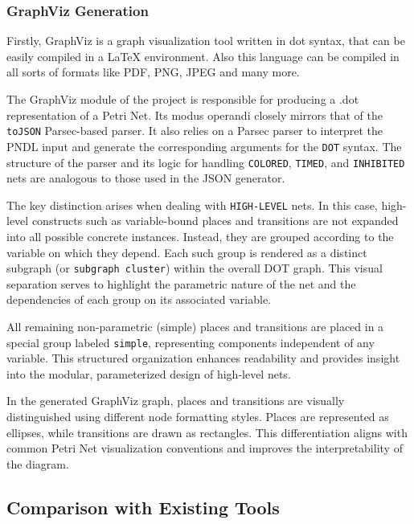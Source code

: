 \documentclass[12pt]{article}
\begin{document}
        
        \subsubsection{GraphViz Generation}
            Firstly, GraphViz is a graph visualization tool written in dot syntax, that can be easily compiled in a LaTeX environment. Also this language can be compiled in all sorts of formats like PDF, PNG, JPEG and many more.  

            The GraphViz module of the project is responsible for producing a .dot representation of a Petri Net. Its modus operandi closely mirrors that of the \texttt{toJSON} Parsec-based parser. It also relies on a Parsec parser to interpret the PNDL input and generate the corresponding arguments for the \texttt{DOT} syntax. The structure of the parser and its logic for handling \texttt{COLORED}, \texttt{TIMED}, and \texttt{INHIBITED} nets are analogous to those used in the JSON generator.
            
            The key distinction arises when dealing with \texttt{HIGH-LEVEL} nets. In this case, high-level constructs such as variable-bound places and transitions are not expanded into all possible concrete instances. Instead, they are grouped according to the variable on which they depend. Each such group is rendered as a distinct subgraph (or \texttt{subgraph cluster}) within the overall DOT graph. This visual separation serves to highlight the parametric nature of the net and the dependencies of each group on its associated variable.
            
            All remaining non-parametric (simple) places and transitions are placed in a special group labeled \texttt{simple}, representing components independent of any variable. This structured organization enhances readability and provides insight into the modular, parameterized design of high-level nets.

            In the generated GraphViz graph, places and transitions are visually distinguished using different node formatting styles. Places are represented as ellipses, while transitions are drawn as rectangles. This differentiation aligns with common Petri Net visualization conventions and improves the interpretability of the diagram.
    
        \subsection{Comparison with Existing Tools}
\end{document}
